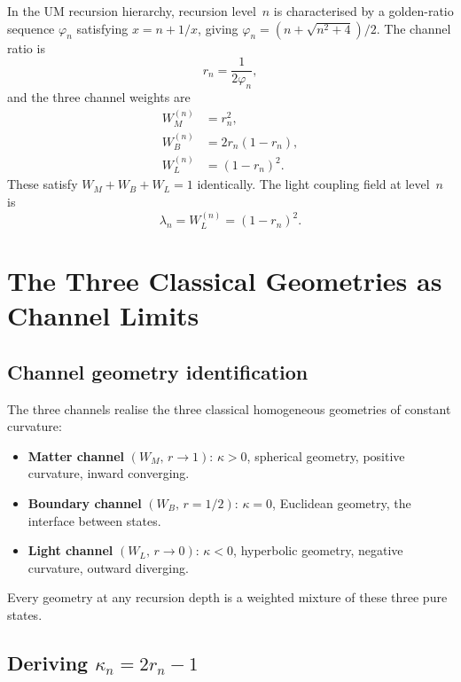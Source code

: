 \documentclass[prd,twocolumn,preprintnumbers,amsmath,amssymb]{revtex4-2}
\newcommand{\phig}{\varphi}
\newcommand{\WL}{W_{L}}
\newcommand{\WB}{W_{B}}
\newcommand{\WM}{W_{M}}
\begin{document}
In the UM recursion hierarchy, recursion level~$n$ is characterised by a
golden-ratio sequence $\phig_n$ satisfying $x = n + 1/x$, giving
$\phig_n = (n + \sqrt{n^2+4})/2$.  The channel ratio is
\begin{equation}
  r_n = \frac{1}{2\phig_n},
  \label{eq:rn}
\end{equation}
and the three channel weights are
\begin{align}
  \WM^{(n)} &= r_n^2, \label{eq:WM}\\
  \WB^{(n)} &= 2r_n(1-r_n), \label{eq:WB}\\
  \WL^{(n)} &= (1-r_n)^2. \label{eq:WL}
\end{align}
These satisfy $\WM + \WB + \WL = 1$ identically.  The light coupling field at
level~$n$ is
\begin{equation}
  \lambda_n = \WL^{(n)} = (1-r_n)^2.
  \label{eq:lambda}
\end{equation}

\section{The Three Classical Geometries as Channel Limits}
\label{sec:three}

\subsection{Channel geometry identification}

The three channels realise the three classical homogeneous geometries of
constant curvature:
\begin{itemize}
  \item \textbf{Matter channel} $(\WM,\,r\to 1)$: $\kappa > 0$, spherical
        geometry, positive curvature, inward converging.
  \item \textbf{Boundary channel} $(\WB,\,r=1/2)$: $\kappa = 0$, Euclidean
        geometry, the interface between states.
  \item \textbf{Light channel} $(\WL,\,r\to 0)$: $\kappa < 0$, hyperbolic
        geometry, negative curvature, outward diverging.
\end{itemize}

Every geometry at any recursion depth is a weighted mixture of these three pure
states.

\subsection{Deriving $\kappa_n = 2r_n - 1$}
\end{document}
